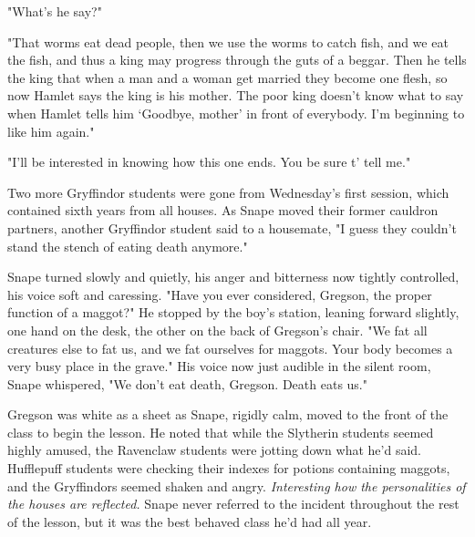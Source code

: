 "What's he say?"

"That worms eat dead people, then we use the worms to catch fish, and we eat the fish, and thus a king may progress through the guts of a beggar. Then he tells the king that when a man and a woman get married they become one flesh, so now Hamlet says the king is his mother. The poor king doesn't know what to say when Hamlet tells him `Goodbye, mother' in front of everybody. I'm beginning to like him again."

"I'll be interested in knowing how this one ends. You be sure t' tell me."

Two more Gryffindor students were gone from Wednesday's first session, which contained sixth years from all houses. As Snape moved their former cauldron partners, another Gryffindor student said to a housemate, "I guess they couldn't stand the stench of eating death anymore."

Snape turned slowly and quietly, his anger and bitterness now tightly controlled, his voice soft and caressing. "Have you ever considered, Gregson, the proper function of a maggot?" He stopped by the boy's station, leaning forward slightly, one hand on the desk, the other on the back of Gregson's chair. "We fat all creatures else to fat us, and we fat ourselves for maggots. Your body becomes a very busy place in the grave." His voice now just audible in the silent room, Snape whispered, "We don't eat death, Gregson. Death eats us."

Gregson was white as a sheet as Snape, rigidly calm, moved to the front of the class to begin the lesson. He noted that while the Slytherin students seemed highly amused, the Ravenclaw students were jotting down what he'd said. Hufflepuff students were checking their indexes for potions containing maggots, and the Gryffindors seemed shaken and angry. \emph{Interesting how the personalities of the houses are reflected.} Snape never referred to the incident throughout the rest of the lesson, but it was the best behaved class he'd had all year. 



